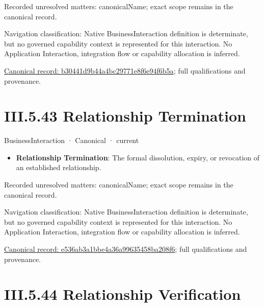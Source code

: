 {\small Recorded unresolved matters: canonicalName; exact scope remains in the canonical record.}\par
{\small Navigation classification: Native BusinessInteraction definition is determinate, but no governed capability context is represented for this interaction. No Application Interaction, integration flow or capability allocation is inferred.}\par
{\footnotesize \href{../../../../../../../continuum/business/business-interaction/b30441d9b44a4bc29771e8f6e94f6b5a.md}{Canonical record: b30441d9b44a4bc29771e8f6e94f6b5a}; full qualifications and provenance.}\par
\section*{III.5.43 Relationship Termination}
\label{navigation:III.5.43}

\label{element:e536ab3a1bbe4a36a99635458ba208f6}
{\small BusinessInteraction · Canonical · current}\par

\begin{itemize}


\item \textbf{Relationship Termination}: The formal dissolution, expiry, or revocation of an established relationship.

\end{itemize}

{\small Recorded unresolved matters: canonicalName; exact scope remains in the canonical record.}\par
{\small Navigation classification: Native BusinessInteraction definition is determinate, but no governed capability context is represented for this interaction. No Application Interaction, integration flow or capability allocation is inferred.}\par
{\footnotesize \href{../../../../../../../continuum/business/business-interaction/e536ab3a1bbe4a36a99635458ba208f6.md}{Canonical record: e536ab3a1bbe4a36a99635458ba208f6}; full qualifications and provenance.}\par
\section*{III.5.44 Relationship Verification}
\label{navigation:III.5.44}

